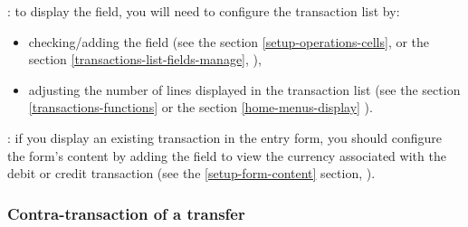\noindent
\Note{}: to display the  field, you will need to configure the transaction list by:
\begin{itemize}
	\item checking/adding the  field (see the section \vref{setup-operations-cells},  or the section \vref{transactions-list-fields-manage}, ),
	\item adjusting the number of lines displayed in the transaction list (see the section \vref{transactions-functions}  or the section \vref{home-menus-display} ).
\end{itemize}

\Note{}: if you display an existing transaction in the entry form, you should configure the form’s content by adding the  field to view the currency associated with the debit or credit transaction (see the \vref{setup-form-content} section, ).


\subsubsection{Contra-transaction of a transfer\label{transactions-new-transfer-associatedOperation}}

